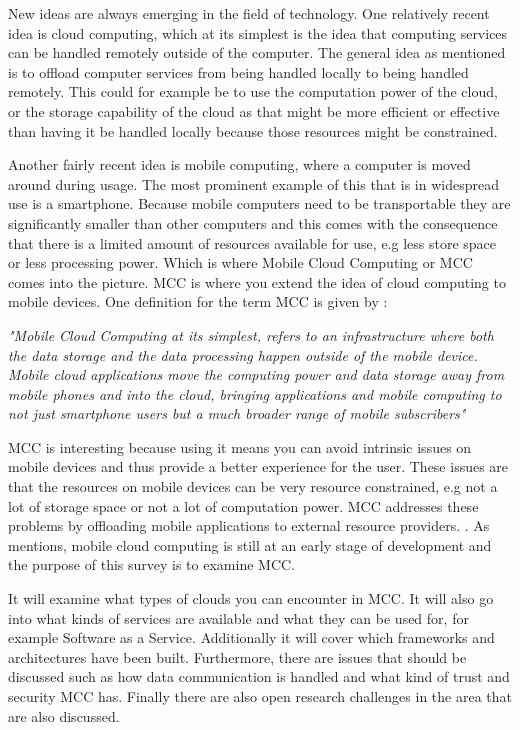 
New ideas are always emerging in the field of technology.
One relatively recent idea is cloud computing, which at its simplest is the idea that computing services can be handled remotely outside of the computer. 
The general idea as mentioned is to offload computer services from being handled locally to being handled remotely. 
This could for example be to use the computation power of the cloud, or the storage capability of the cloud as that might be more efficient or effective than having it be handled locally because those resources might be constrained.

Another fairly recent idea is mobile computing, where a computer is moved around during usage.
The most prominent example of this that is in widespread use is a smartphone.
Because mobile computers need to be transportable they are significantly smaller than other computers and this comes with the consequence that there is a limited amount of resources available for use, e.g less store space or less processing power.
Which is where Mobile Cloud Computing or MCC comes into the picture. 
MCC is where you extend the idea of cloud computing to mobile devices.
One definition for the term MCC is given by \citet{article:mobilecloudreviewinderkildesecurity}:

\textit{"Mobile Cloud Computing at its simplest, refers to an infrastructure where both the data storage and the data processing happen outside of the mobile device. Mobile cloud applications move the computing power and data storage away from mobile phones and into the cloud, bringing applications and mobile computing to not just smartphone users but a much broader range of mobile subscribers"}

MCC is interesting because using it means you can avoid intrinsic issues on mobile devices and thus provide a better experience for the user. 
These issues are that the resources on mobile devices can be very resource constrained, e.g not a lot of storage space or not a lot of computation power.
MCC addresses these problems by offloading mobile applications to external resource providers. \citet{fernando2013mobile}.
As \citet{6215350} mentions, mobile cloud computing is still at an early stage of development and the purpose of this survey is to examine MCC. 

It will examine what types of clouds you can encounter in MCC.
It will also go into what kinds of services are available and what they can be used for, for example Software as a Service.
Additionally it will cover which frameworks and architectures have been built. 
Furthermore, there are issues that should be discussed such as how data communication is handled and what kind of trust and security MCC has. 
Finally there are also open research challenges in the area that are also discussed. 
